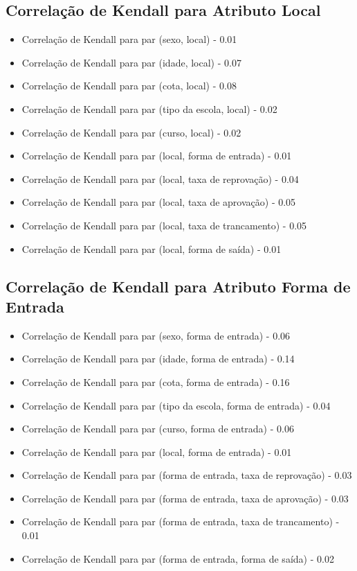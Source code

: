 \subsection{Correlação de Kendall para Atributo Local}
\begin{itemize}
    \item Correlação de Kendall para par (sexo, local) - 0.01
    \item Correlação de Kendall para par (idade, local) - 0.07
    \item Correlação de Kendall para par (cota, local) - 0.08
    \item Correlação de Kendall para par (tipo da escola, local) - 0.02
    \item Correlação de Kendall para par (curso, local) - 0.02
    \item Correlação de Kendall para par (local, forma de entrada) - 0.01
    \item Correlação de Kendall para par (local, taxa de reprovação) - 0.04
    \item Correlação de Kendall para par (local, taxa de aprovação) - 0.05
    \item Correlação de Kendall para par (local, taxa de trancamento) - 0.05
    \item Correlação de Kendall para par (local, forma de saída) - 0.01
\end{itemize}

\subsection{Correlação de Kendall para Atributo Forma de Entrada}
\begin{itemize}
    \item Correlação de Kendall para par (sexo, forma de entrada) - 0.06
    \item Correlação de Kendall para par (idade, forma de entrada) - 0.14
    \item Correlação de Kendall para par (cota, forma de entrada) - 0.16
    \item Correlação de Kendall para par (tipo da escola, forma de entrada) - 0.04
    \item Correlação de Kendall para par (curso, forma de entrada) - 0.06
    \item Correlação de Kendall para par (local, forma de entrada) - 0.01
    \item Correlação de Kendall para par (forma de entrada, taxa de reprovação) - 0.03
    \item Correlação de Kendall para par (forma de entrada, taxa de aprovação) - 0.03
    \item Correlação de Kendall para par (forma de entrada, taxa de trancamento) - 0.01
    \item Correlação de Kendall para par (forma de entrada, forma de saída) - 0.02
\end{itemize}

